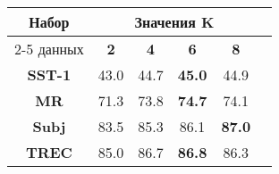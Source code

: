 \begin{minipage}{\linewidth}
\begin{center}
 \label{tab:title} 
\begin{tabular}{|c|c|c|c|c|c|}
\hline
\multirow{2}{*}{Набор}   &  \multicolumn{4}{c|}{Значения K} \\ \cline{2-5} 
     данных              &  \textbf{2}& \textbf{4}   & \textbf{6} & \textbf{8} \\ \hline
\textbf{SST-1}           & 43.0       &  44.7 & \textbf{45.0}     & 44.9     \\ \hline
\textbf{MR}              & 71.3       & 73.8  & \textbf{74.7}     & 74.1     \\ \hline
\textbf{Subj}            & 83.5       & 85.3  & 86.1              & \textbf{87.0} \\ \hline
\textbf{TREC}            & 85.0       & 86.7  & \textbf{86.8}     & 86.3     \\ \hline
\end{tabular}
\end{center}
\end{minipage}
\vspace{5mm}